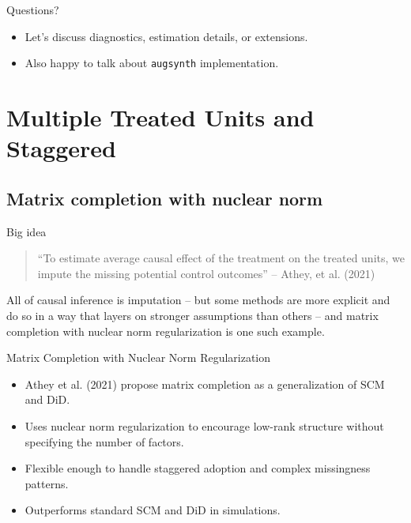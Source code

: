 \documentclass{beamer}
\begin{document}
\begin{frame}{Questions?}
  \begin{itemize}
    \item Let’s discuss diagnostics, estimation details, or extensions.
    \item Also happy to talk about \texttt{augsynth} implementation.
  \end{itemize}
\end{frame}



\section{Multiple Treated Units and Staggered}





\subsection{Matrix completion with nuclear norm}

\begin{frame}{Big idea}

\begin{quote}
``To estimate average causal effect of the treatment on the treated units, we impute the missing potential control outcomes'' -- Athey, et al. (2021)
\end{quote}

\bigskip

All of causal inference is imputation -- but some methods are more explicit and do so in a way that layers on stronger assumptions than others -- and matrix completion with nuclear norm regularization is one such example. 


\end{frame}

\begin{frame}{Matrix Completion with Nuclear Norm Regularization}
\small
\begin{itemize}
  \item Athey et al. (2021) propose matrix completion as a generalization of SCM and DiD.
  \item Uses nuclear norm regularization to encourage low-rank structure without specifying the number of factors.
  \item Flexible enough to handle staggered adoption and complex missingness patterns.
  \item Outperforms standard SCM and DiD in simulations.
\end{itemize}

\end{frame}
\end{document}
